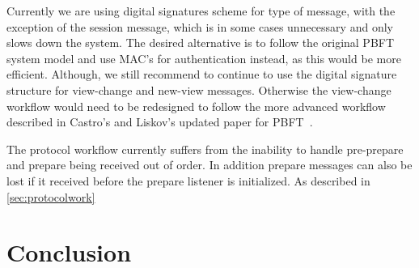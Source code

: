 Currently we are using digital signatures scheme for type of message, with the exception of the session message, which is in some cases unnecessary and only slows down the system. The desired alternative is to follow the original PBFT system model and use MAC's for authentication instead, as this would be more efficient. Although, we still recommend to continue to use the digital signature structure for view-change and new-view messages. Otherwise the view-change workflow would need to be redesigned to follow the more advanced workflow described in Castro's and Liskov's updated paper for PBFT~\cite[p.~410-414]{PAPER:PBFTRecovery}. 

The protocol workflow currently suffers from the inability to handle pre-prepare and prepare being received out of order. In addition prepare messages can also be lost if it received before the prepare listener is initialized. As described in \autoref{sec:protocolwork}

\section{Conclusion}
